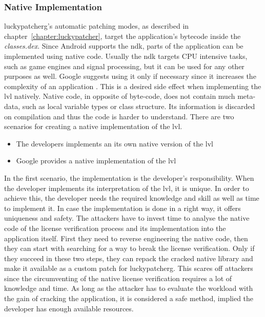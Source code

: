 \subsubsection{Native Implementation} \label{subsection:counter-modifications-dynamic}
\gls{luckypatcherg}'s automatic patching modes, as described in chapter~\ref{chapter:luckypatcher}, target the application's bytecode inside the \textit{classes.dex}.
Since Android supports the \gls{ndk}, parts of the application can be implemented using native code.
\newline
Usually the \gls{ndk} targets CPU intensive tasks, such as game engines and signal processing, but it can be used for any other purposes as well.
Google suggests using it only if necessary since it increases the complexity of an application \cite{androidNdk}.
This is a desired side effect when implementing the \gls{lvl} natively.
Native code, in opposite of byte-code, does not contain much meta-data, such as local variable types or class structure.
Its information is discarded on compilation and thus the code is harder to understand.
\newline
There are two scenarios for creating a native implementation of the \gls{lvl}.
\begin{itemize}
  \item The developers implements an its own native version of the \gls{lvl}
  \item Google provides a native implementation of the \gls{lvl}
\end{itemize}
In the first scenario, the implementation is the developer's responsibility.
When the developer implements its interpretation of the \gls{lvl}, it is unique.
In order to achieve this, the developer needs the required knowledge and skill as well as time to implement it.
In case the implementation is done in a right way, it offers uniqueness and safety.
The attackers have to invest time to analyse the native code of the license verification process and its implementation into the application itself.
First they need to reverse engineering the native code, then they can start with searching for a way to break the license verification.
Only if they succeed in these two steps, they can repack the cracked native library and make it available as a custom patch for \gls{luckypatcherg}.
This scares off attackers since the circumventing of the native license verification requires a lot of knowledge and time.
As long as the attacker has to evaluate the workload with the gain of cracking the application, it is considered a safe method, implied the developer has enough available resources. \cite{munteanLicense}
